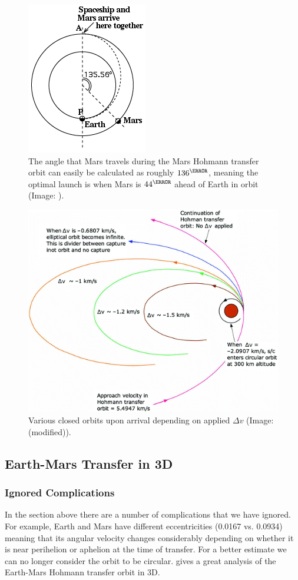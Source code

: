 \begin{figure}[ht]
    \centering
    \includegraphics[width=0.35\linewidth]{fig/Hohmann-angle.png}
    \caption{The angle that Mars travels during the Mars Hohmann transfer orbit can easily be calculated as roughly \(136^\degree\), meaning the optimal launch is when Mars is \(44^\degree\) ahead of Earth in orbit (Image: \cite{Stern}).}
    \label{fig:Hohmann-angle}
\end{figure}

\begin{figure}[ht]
    \centering
    \includegraphics[width=0.85\linewidth]{fig/mars-arrival-orbit.png}
    \caption{Various closed orbits upon arrival depending on applied $\Delta v$ (Image: \cite[p.~137]{Rapp2016} (modified)).}
    \label{fig:mars-arrival-orbit}
\end{figure}

\clearpage

\subsection{Earth-Mars Transfer in 3D}
\subsubsection{Ignored Complications}
In the section above there are a number of complications that we have ignored. For example, Earth and Mars have different eccentricities (0.0167 vs. 0.0934) meaning that its angular velocity changes considerably depending on whether it is near perihelion or aphelion at the time of transfer. For a better estimate we can no longer consider the orbit to be circular. \cite{Braeuniga} gives a great analysis of the Earth-Mars Hohmann transfer orbit in 3D.


